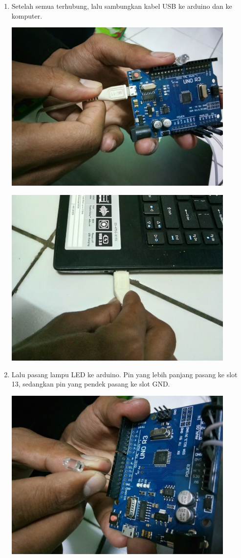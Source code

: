 \begin{enumerate}
\item Setelah semua terhubung, lalu sambungkan kabel USB ke arduino dan ke komputer.
\break
\centerline{\includegraphics[width=0.9\textwidth]{figures/ss8.jpeg}}
\break
\centerline{\includegraphics[width=0.9\textwidth]{figures/ss7.jpeg}}
\item Lalu pasang lampu LED ke arduino. Pin yang lebih panjang pasang ke slot 13, sedangkan pin yang pendek pasang ke slot GND.
\break
\centerline{\includegraphics[width=0.9\textwidth]{figures/ss9.jpeg}}

\end{enumerate}
